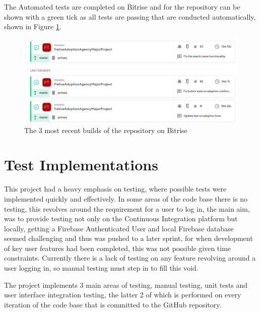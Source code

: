The Automated tests are completed on Bitrise and for the repository can be shown with a green tick as all tests are passing that are conducted automatically, shown in Figure \ref{fig:bitriseBuilds}.

 \begin{figure} [htbp!]
        \centering
        \includegraphics[width=\textwidth]{Images/Bitrise Repo Builds.PNG}
        \caption{The 3 most recent builds of the repository on Bitrise}
        \label{fig:bitriseBuilds}
    \end{figure}

\section{Test Implementations}

This project had a heavy emphasis on testing, where possible tests were implemented quickly and effectively. In some areas of the code base there is no testing, this revolves around the requirement for a user to log in, the main aim, was to provide testing not only on the Continuous Integration platform but locally, getting a Firebase Authenticated User and local Firebase database seemed challenging and thus was pushed to a later sprint, for when development of key user features had been completed, this was not possible given time constraints. Currently there is a lack of testing on any feature revolving around a user logging in, so manual testing must step in to fill this void.

The project implements 3 main areas of testing, manual testing, unit tests and user interface integration testing, the latter 2 of which is performed on every iteration of the code base that is committed to the GitHub repository.

